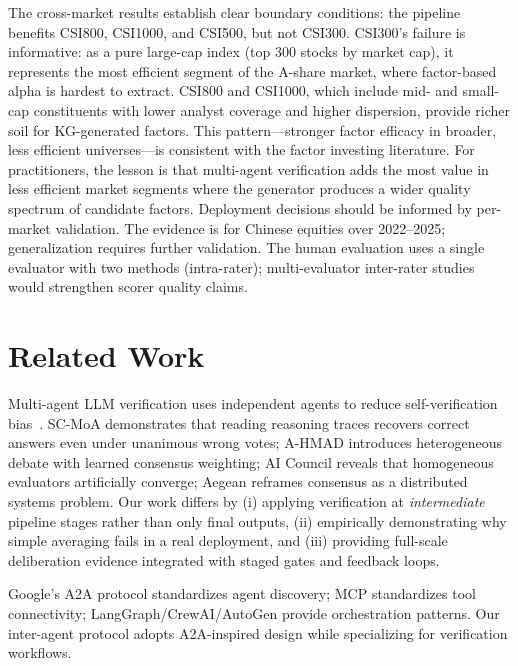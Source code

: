 \documentclass[sigconf]{acmart}
\begin{document}
The cross-market results establish clear boundary conditions: the pipeline benefits CSI800, CSI1000, and CSI500, but not CSI300. CSI300's failure is informative: as a pure large-cap index (top 300 stocks by market cap), it represents the most efficient segment of the A-share market, where factor-based alpha is hardest to extract. CSI800 and CSI1000, which include mid- and small-cap constituents with lower analyst coverage and higher dispersion, provide richer soil for KG-generated factors. This pattern---stronger factor efficacy in broader, less efficient universes---is consistent with the factor investing literature. For practitioners, the lesson is that multi-agent verification adds the most value in less efficient market segments where the generator produces a wider quality spectrum of candidate factors. Deployment decisions should be informed by per-market validation. The evidence is for Chinese equities over 2022--2025; generalization requires further validation. The human evaluation uses a single evaluator with two methods (intra-rater); multi-evaluator inter-rater studies would strengthen scorer quality claims.

\section{Related Work}

Multi-agent LLM verification uses independent agents to reduce self-verification bias~\cite{wang2025masllm,ghafarollahi2024sciagents,mao2025blueprint2code}. SC-MoA demonstrates that reading reasoning traces recovers correct answers even under unanimous wrong votes; A-HMAD introduces heterogeneous debate with learned consensus weighting; AI Council reveals that homogeneous evaluators artificially converge; Aegean reframes consensus as a distributed systems problem. Our work differs by (i) applying verification at \emph{intermediate} pipeline stages rather than only final outputs, (ii) empirically demonstrating why simple averaging fails in a real deployment, and (iii) providing full-scale deliberation evidence integrated with staged gates and feedback loops.

Google's A2A protocol standardizes agent discovery; MCP standardizes tool connectivity; LangGraph/CrewAI/AutoGen provide orchestration patterns. Our inter-agent protocol adopts A2A-inspired design while specializing for verification workflows.
\end{document}
